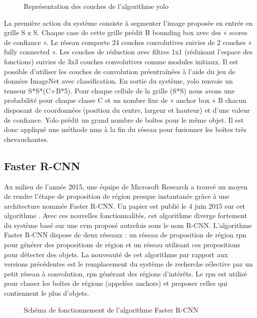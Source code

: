 \documentclass[debug,nodate,hideweeklyreports,noposter]{polytech/polytech}
\begin{document}
\begin{figure}
  \caption{Représentation des couches de l'algorithme yolo}
  \label{fig:yololayers}
\end{figure}

La première action du système consiste à segmenter l’image proposée en entrée en grille S x S. Chaque case de cette grille prédit B bounding box avec des « scores de confiance ».
Le réseau comporte 24 couches convolutives suivies de 2 couches « fully connected ». Les couches de réduction avec filtres 1x1 (réduisant l’espace des fonctions) suivies de 3x3 couches convolutives comme modules initiaux. Il est possible d’utiliser les couches de convolution préentraînées à l'aide du jeu de données ImageNet avec classification.
En sortie du système, yolo renvoie un tenseur S*S*(C+B*5). Pour chaque cellule de la grille (S*S) nous avons une probabilité pour chaque classe C et un nombre fixe de « anchor box » B chacun disposant de coordonnées (position du centre, largeur et hauteur) et d’une valeur de confiance. 
Yolo prédit un grand nombre de boîtes pour le même objet. Il est donc appliqué une méthode \gls{nms} à la fin du réseau pour fusionner les boîtes très chevauchantes.

\subsection{Faster R-CNN}

Au milieu de l’année 2015, une équipe de Microsoft Research a trouvé un moyen de rendre l’étape de proposition de région presque instantanée grâce à une architecture nommée Faster R-CNN. Un papier est publié le 4 juin 2015 sur cet algorithme \cite{DBLP:journals/corr/RenHG015}. Avec ces nouvelles fonctionnalités, cet algorithme diverge fortement du système basé sur une \gls{svm} proposé autrefois sous le nom R-CNN.
L’algorithme Faster R-CNN dispose de deux réseaux : un réseau de proposition de région \gls{rpn} pour générer des propositions de région et un réseau utilisant ces propositions pour détecter des objets. La nouveauté de cet algorithme par rapport aux versions précédentes est le remplacement du système de recherche sélective par un petit réseau à convolution, \gls{rpn} générant des régions d’intérêts.
Le \gls{rpn} est utilisé pour classer les boîtes de régions (appelées anchors) et proposer celles qui contiennent le plus d’objets. 

\begin{figure}
  \caption{Schéma de fonctionnement de l'algorithme Faster R-CNN}
  \label{fig:fasterrcnn}
\end{figure}
\end{document}
